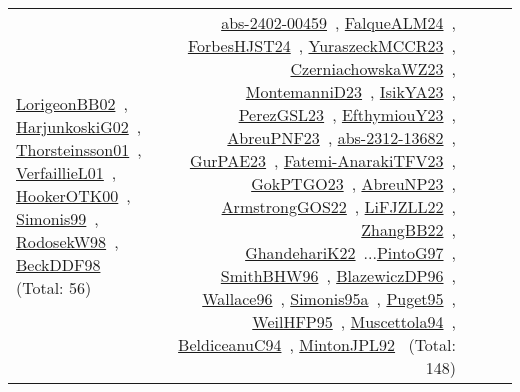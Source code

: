 {\begin{longtable}{p{3cm}r>{\raggedright\arraybackslash}p{6cm}>{\raggedright\arraybackslash}p{6cm}>{\raggedright\arraybackslash}p{8cm}}
\href{../works/LorigeonBB02.pdf}{LorigeonBB02}~\cite{LorigeonBB02}, \href{../works/HarjunkoskiG02.pdf}{HarjunkoskiG02}~\cite{HarjunkoskiG02}, \href{../works/Thorsteinsson01.pdf}{Thorsteinsson01}~\cite{Thorsteinsson01}, \href{../works/VerfaillieL01.pdf}{VerfaillieL01}~\cite{VerfaillieL01}, \href{../works/HookerOTK00.pdf}{HookerOTK00}~\cite{HookerOTK00}, \href{../works/Simonis99.pdf}{Simonis99}~\cite{Simonis99}, \href{../works/RodosekW98.pdf}{RodosekW98}~\cite{RodosekW98}, \href{../works/BeckDDF98.pdf}{BeckDDF98}~\cite{BeckDDF98} (Total: 56) & \href{../works/abs-2402-00459.pdf}{abs-2402-00459}~\cite{abs-2402-00459}, \href{../works/FalqueALM24.pdf}{FalqueALM24}~\cite{FalqueALM24}, \href{../works/ForbesHJST24.pdf}{ForbesHJST24}~\cite{ForbesHJST24}, \href{../works/YuraszeckMCCR23.pdf}{YuraszeckMCCR23}~\cite{YuraszeckMCCR23}, \href{../works/CzerniachowskaWZ23.pdf}{CzerniachowskaWZ23}~\cite{CzerniachowskaWZ23}, \href{../works/MontemanniD23.pdf}{MontemanniD23}~\cite{MontemanniD23}, \href{../works/IsikYA23.pdf}{IsikYA23}~\cite{IsikYA23}, \href{../works/PerezGSL23.pdf}{PerezGSL23}~\cite{PerezGSL23}, \href{../works/EfthymiouY23.pdf}{EfthymiouY23}~\cite{EfthymiouY23}, \href{../works/AbreuPNF23.pdf}{AbreuPNF23}~\cite{AbreuPNF23}, \href{../works/abs-2312-13682.pdf}{abs-2312-13682}~\cite{abs-2312-13682}, \href{../works/GurPAE23.pdf}{GurPAE23}~\cite{GurPAE23}, \href{../works/Fatemi-AnarakiTFV23.pdf}{Fatemi-AnarakiTFV23}~\cite{Fatemi-AnarakiTFV23}, \href{../works/GokPTGO23.pdf}{GokPTGO23}~\cite{GokPTGO23}, \href{../works/AbreuNP23.pdf}{AbreuNP23}~\cite{AbreuNP23}, \href{../works/ArmstrongGOS22.pdf}{ArmstrongGOS22}~\cite{ArmstrongGOS22}, \href{../works/LiFJZLL22.pdf}{LiFJZLL22}~\cite{LiFJZLL22}, \href{../works/ZhangBB22.pdf}{ZhangBB22}~\cite{ZhangBB22}, \href{../works/GhandehariK22.pdf}{GhandehariK22}~\cite{GhandehariK22}...\href{../works/PintoG97.pdf}{PintoG97}~\cite{PintoG97}, \href{../works/SmithBHW96.pdf}{SmithBHW96}~\cite{SmithBHW96}, \href{../works/BlazewiczDP96.pdf}{BlazewiczDP96}~\cite{BlazewiczDP96}, \href{../works/Wallace96.pdf}{Wallace96}~\cite{Wallace96}, \href{../works/Simonis95a.pdf}{Simonis95a}~\cite{Simonis95a}, \href{../works/Puget95.pdf}{Puget95}~\cite{Puget95}, \href{../works/WeilHFP95.pdf}{WeilHFP95}~\cite{WeilHFP95}, \href{../works/Muscettola94.pdf}{Muscettola94}~\cite{Muscettola94}, \href{../works/BeldiceanuC94.pdf}{BeldiceanuC94}~\cite{BeldiceanuC94}, \href{../works/MintonJPL92.pdf}{MintonJPL92}~\cite{MintonJPL92} (Total: 148)\\

\end{longtable}}
